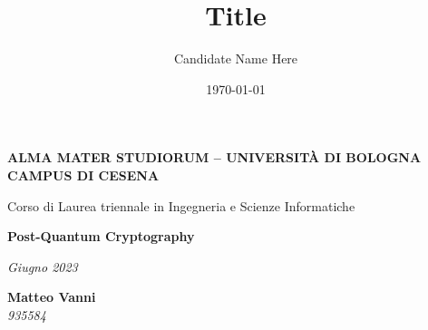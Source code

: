 \title{Title}
\author{Candidate Name Here}
\date{\today}

\begin{titlepage}
	\begin{center}
		
		\large
		\textbf{ALMA MATER STUDIORUM -- UNIVERSITÀ DI BOLOGNA \\ CAMPUS DI CESENA}
		\\
		\noindent\hrulefill
		\vspace{0.4cm}
		
		\Large
		Corso di Laurea triennale in Ingegneria e Scienze Informatiche
		
		\Huge
		\vspace{4cm}
		\textbf{
            Post-Quantum Cryptography
		}
		
		\large
		\vspace{1cm}
		
		\vspace{5.5cm}
		\begin{minipage}[t]{0.64\textwidth}
			\begin{flushleft}
                \textit{Giugno 2023}
			\end{flushleft}
		\end{minipage}
		\begin{minipage}[t]{0.34\textwidth}
			\begin{flushright}
				\textbf{Matteo Vanni}
                \\
                \textit{935584}
			\end{flushright}
		\end{minipage}\\
		
		\vfill
		\noindent\hrulefill
		\vspace{0.3cm}
		\Large
		
	\end{center}
\end{titlepage}
